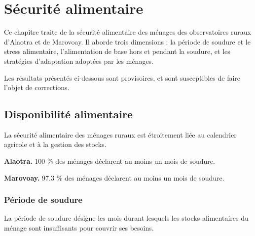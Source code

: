 \documentclass[
  french,
  letterpaper,
]{report}
\begin{document}

\chapter{Sécurité alimentaire}\label{suxe9curituxe9-alimentaire}

Ce chapitre traite de la sécurité alimentaire des ménages des
observatoires ruraux d'Alaotra et de Marovoay. Il aborde trois
dimensions : la période de soudure et le stress alimentaire,
l'alimentation de base hors et pendant la soudure, et les stratégies
d'adaptation adoptées par les ménages.

\begin{tcolorbox}[enhanced jigsaw, colframe=quarto-callout-warning-color-frame, colback=white, titlerule=0mm, colbacktitle=quarto-callout-warning-color!10!white, toptitle=1mm, opacitybacktitle=0.6, title=\textcolor{quarto-callout-warning-color}{\faExclamationTriangle}\hspace{0.5em}{Travail de vérification en cours}, left=2mm, leftrule=.75mm, bottomtitle=1mm, coltitle=black, arc=.35mm, rightrule=.15mm, bottomrule=.15mm, toprule=.15mm, opacityback=0, breakable]

Les résultats présentés ci-dessous sont provisoires, et sont
susceptibles de faire l'objet de corrections.

\end{tcolorbox}

\section{Disponibilité alimentaire}\label{disponibilituxe9-alimentaire}

La sécurité alimentaire des ménages ruraux est étroitement liée au
calendrier agricole et à la gestion des stocks.

\textbf{Alaotra.} 100 \% des ménages déclarent au moins un mois de
soudure.

\textbf{Marovoay.} 97.3 \% des ménages déclarent au moins un mois de
soudure.

\subsection{Période de soudure}\label{puxe9riode-de-soudure}

La période de soudure désigne les mois durant lesquels les stocks
alimentaires du ménage sont insuffisants pour couvrir ses besoins.
\end{document}

